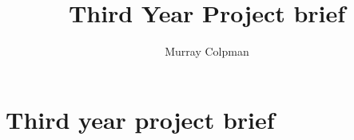 \documentclass[a4paper,12pt]{article}
\title{Third Year Project brief}
\author{Murray Colpman}
\begin{document}
\maketitle

\section*{Third year project brief}
\end{document}
